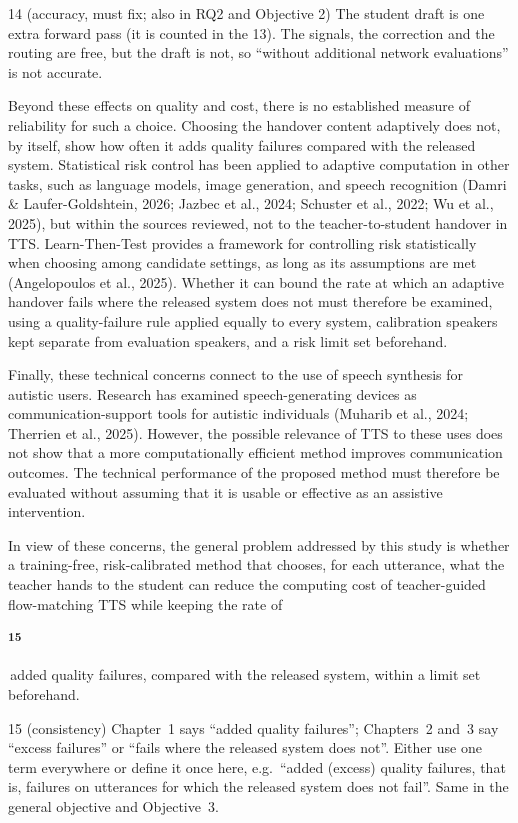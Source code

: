 \documentclass[11pt,a4paper]{article}
\newcommand{\flag}[2]{\colorbox{flagcol}{\strut\textsuperscript{\bfseries #1}}\,{#2}}
\newcounter{cmt}
\begin{document}
\begin{cmt}{14 (accuracy, must fix; also in RQ2 and Objective 2)}
The student draft is one extra forward pass (it is counted in the 13). The signals, the correction and the routing are free, but the draft is not, so ``without additional network evaluations'' is not accurate.
\end{cmt}

Beyond these effects on quality and cost, there is no established measure of reliability for such a choice. Choosing the handover content adaptively does not, by itself, show how often it adds quality failures compared with the released system. Statistical risk control has been applied to adaptive computation in other tasks, such as language models, image generation, and speech recognition (Damri \& Laufer-Goldshtein, 2026; Jazbec et al., 2024; Schuster et al., 2022; Wu et al., 2025), but within the sources reviewed, not to the teacher-to-student handover in TTS. Learn-Then-Test provides a framework for controlling risk statistically when choosing among candidate settings, as long as its assumptions are met (Angelopoulos et al., 2025). Whether it can bound the rate at which an adaptive handover fails where the released system does not must therefore be examined, using a quality-failure rule applied equally to every system, calibration speakers kept separate from evaluation speakers, and a risk limit set beforehand.

Finally, these technical concerns connect to the use of speech synthesis for autistic users. Research has examined speech-generating devices as communication-support tools for autistic individuals (Muharib et al., 2024; Therrien et al., 2025). However, the possible relevance of TTS to these uses does not show that a more computationally efficient method improves communication outcomes. The technical performance of the proposed method must therefore be evaluated without assuming that it is usable or effective as an assistive intervention.

In view of these concerns, the general problem addressed by this study is whether a training-free, risk-calibrated method that chooses, for each utterance, what the teacher hands to the student can reduce the computing cost of teacher-guided flow-matching TTS while keeping the rate of \flag{15}{added quality failures}, compared with the released system, within a limit set beforehand.

\begin{cmt}{15 (consistency)}
Chapter~1 says ``added quality failures''; Chapters~2 and~3 say ``excess failures'' or ``fails where the released system does not''. Either use one term everywhere or define it once here, e.g.\ ``added (excess) quality failures, that is, failures on utterances for which the released system does not fail''. Same in the general objective and Objective~3.
\end{cmt}
\end{document}
